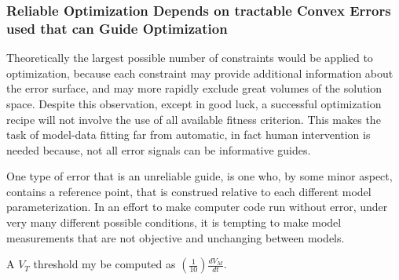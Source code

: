 
\subsubsection{Reliable Optimization Depends on tractable Convex Errors used that can Guide Optimization}


Theoretically the largest possible number of constraints would be applied to optimization, because each constraint may provide additional information about the error surface, and may more rapidly exclude great volumes of the solution space. Despite this observation, except in good luck, a successful optimization recipe will not involve the use of all available fitness criterion. This makes the task of model-data fitting far from automatic, in fact human intervention is needed because, not all error signals can be informative guides. 

    
    One type of error that is an unreliable guide, is one who, by some minor aspect, contains a reference point, that is construed relative to each different model parameterization. In an effort to make computer code run without error, under very many different possible conditions, it is tempting to make model measurements that are not objective and unchanging between models. 
    
    A $V_{T}$ threshold my be computed as $(\frac{1}{10})\frac{dV_{M}}{dt}$.
    
